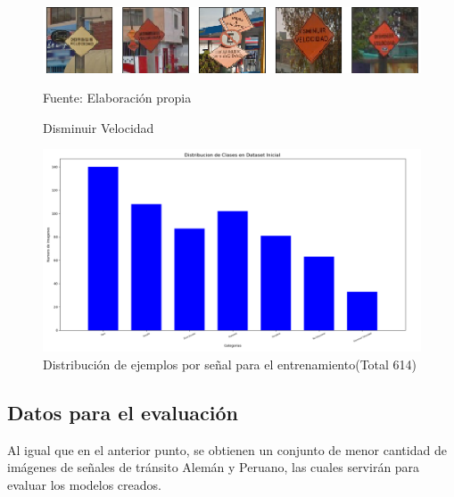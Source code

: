 			\begin{figure}[H]
				\begin{center}
				\includegraphics[width=1\textwidth]{images/desarrollo/imagenes/peru/1__(7).png}
				\end{center}
				\begin{center}
				\caption{\small{Disminuir Velocidad}}
				\vskip -0.25cm
				{\small{Fuente: Elaboración propia}}
				\end{center}
				\vspace{-1.5em}
			\end{figure}

			\begin{figure}[H]
				\begin{center}
				\includegraphics[width=1\textwidth]{images/desarrollo/histograms/inicioTrain614}
				\end{center}
				\begin{center}
				\caption{\small{Distribución de ejemplos por señal para el entrenamiento(Total 614)}}
				{\small{\fontsize{10}{16.8}\selectfont {Fuente: Elaboración propia}}}
				\end{center}
				\vspace{-1.5em}
			\end{figure}

			

	\subsection{Datos para el evaluación}
		Al igual que en el anterior punto, se obtienen un conjunto de menor cantidad de imágenes de señales de tránsito Alemán y Peruano, las cuales servirán para evaluar los modelos creados.

